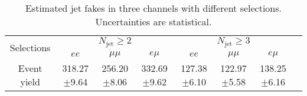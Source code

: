 \begin{table}[!ht]
\begin{center}
\begin{tabular}{c|c|c|c|c|c|cc}
\hline
\hline
\multirow{2}{*}{Selections} &\multicolumn{3}{c|}{$ N_{\text{jet}} \geq 2$}  &\multicolumn{3}{c}{$ N_{\text{jet}} \geq 3$}  \\
\cline{2-7}
                         &$ee$     &$\mu\mu$     &$e\mu$     &$ee$     &$\mu\mu$     &$e\mu$  \\
\hline
Event yield            &318.27$\pm$9.64  &256.20$\pm$8.06 &332.69$\pm$9.62  &127.38$\pm$6.10 &122.97$\pm$5.58 &138.25$\pm$6.16 \\
\hline
\hline
\end{tabular}
\caption{Estimated jet fakes in three channels with different selections. Uncertainties are statistical.}
\label{tab:summary_jet_fakes}
\end{center}
\end{table}

